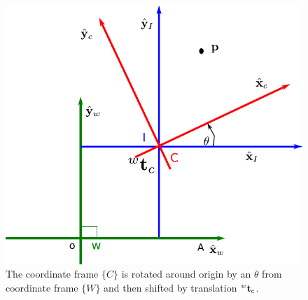 \documentclass{article}
\begin{document}
\begin{figure}
  \includegraphics[width=\linewidth]{media/rot+trans-2D.pdf}
  \caption{The coordinate  frame $\{C\}$  is rotated around origin by an $\theta$
    from coordinate  frame $\{W\}$ and then shifted by translation ${}^w\mathbf{t}_c$.}
  \label{fig:rot+trans-2D}
\end{figure}
\end{document}
